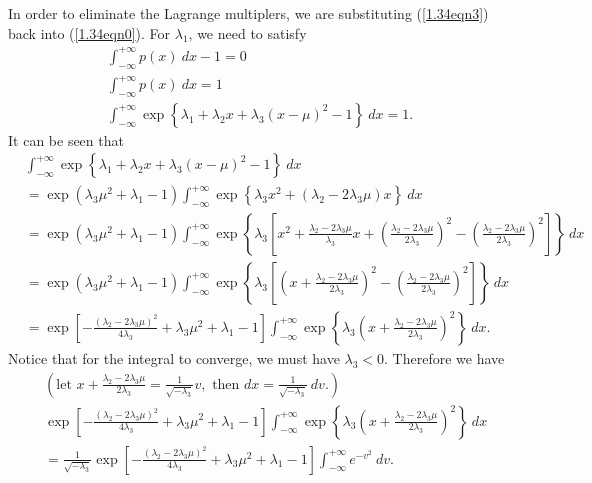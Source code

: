 \begin{answer}{}
	In order to eliminate the Lagrange multiplers, we are substituting (\ref{1.34eqn3}) back into (\ref{1.34eqn0}). For $\lambda_1$, we need to satisfy
	\begin{gather}
		\int_{-\infty}^{+\infty} p(x)\ dx - 1 = 0\\
			\int_{-\infty}^{+\infty} p(x)\ dx  = 1\\
			\int_{-\infty}^{+\infty} \exp\left\{ \lambda_1 + \lambda_2 x + \lambda_3(x-\mu)^2 - 1 \right\}\ dx = 1.
	\end{gather}
	It can be seen that
	\begin{align}
		&\int_{-\infty}^{+\infty} \exp\left\{ \lambda_1 + \lambda_2 x + \lambda_3(x-\mu)^2 - 1 \right\}\ dx\\
		&= \exp\left(\lambda_3 \mu^2 + \lambda_1 - 1\right) \int_{-\infty}^{+\infty} \exp\left\{ \lambda_3 x^2 + (\lambda_2 - 2\lambda_3\mu)x \right\}\ dx\\
		&= \exp\left(\lambda_3 \mu^2 + \lambda_1 - 1\right) \int_{-\infty}^{+\infty} \exp\left\{ \lambda_3 \left[  x^2 + \frac{\lambda_2 - 2\lambda_3\mu}{\lambda_3}x  + \left(\frac{\lambda_2 - 2\lambda_3\mu}{2\lambda_3}\right)^2 - \left(\frac{\lambda_2 - 2\lambda_3\mu}{2\lambda_3}\right)^2\right] \right\}\ dx\\
		&= \exp\left(\lambda_3 \mu^2 + \lambda_1 - 1\right) \int_{-\infty}^{+\infty} \exp\left\{ \lambda_3 \left[ \left( x + \frac{\lambda_2 - 2\lambda_3\mu}{2\lambda_3} \right)^2 - \left(\frac{\lambda_2 - 2\lambda_3\mu}{2\lambda_3}\right)^2 \right] \right\}\ dx\\
		&= \exp\left[ -\frac{(\lambda_2 - 2\lambda_3\mu)^2}{4\lambda_3} + \lambda_3 \mu^2 + \lambda_1 - 1 \right] \int_{-\infty}^{+\infty} \exp\left\{ \lambda_3 \left( x + \frac{\lambda_2 - 2\lambda_3\mu}{2\lambda_3} \right)^2  \right\}\ dx.\label{1.34eqn4}
	\end{align}
	Notice that for the integral to converge, we must have $\lambda_3 < 0$. Therefore we have
	\begin{align}
		&\left(\mbox{let }  x + \frac{\lambda_2 - 2\lambda_3\mu}{2\lambda_3} = \frac{1}{\sqrt{-\lambda_3}}v, \mbox{ then } dx = \frac{1}{\sqrt{-\lambda_3}}\ dv. \right) \nonumber \\
		& \exp\left[ -\frac{(\lambda_2 - 2\lambda_3\mu)^2}{4\lambda_3} + \lambda_3 \mu^2 + \lambda_1 - 1 \right] \int_{-\infty}^{+\infty} \exp\left\{ \lambda_3 \left( x + \frac{\lambda_2 - 2\lambda_3\mu}{2\lambda_3} \right)^2  \right\}\ dx\\
		&=  \frac{1}{\sqrt{-\lambda_3}}\exp\left[ -\frac{(\lambda_2 - 2\lambda_3\mu)^2}{4\lambda_3} + \lambda_3 \mu^2 + \lambda_1 - 1 \right] \int_{-\infty}^{+\infty} e^{-v^2}\ dv.

\end{align}
\end{answer}
